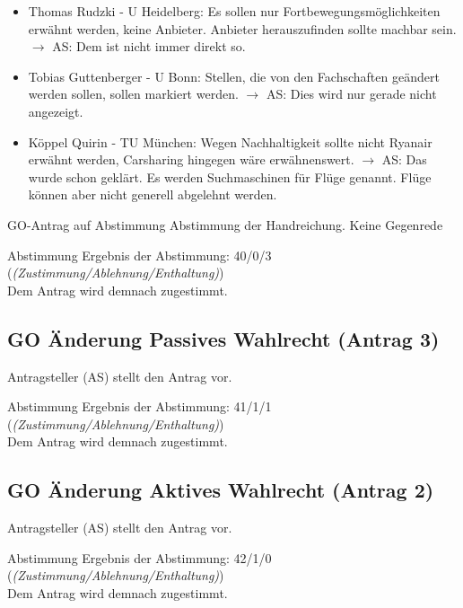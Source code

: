     \begin{itemize}
      \item Thomas Rudzki - U Heidelberg: Es sollen nur Fortbewegungsmöglichkeiten erwähnt werden, keine Anbieter. Anbieter herauszufinden sollte machbar sein. $\rightarrow$ AS: Dem ist nicht immer direkt so.
      \item Tobias Guttenberger - U Bonn: Stellen, die von den Fachschaften geändert werden sollen, sollen markiert werden.
        $\rightarrow$ AS: Dies wird nur gerade nicht angezeigt.
      \item Köppel Quirin - TU München: Wegen Nachhaltigkeit sollte nicht Ryanair erwähnt werden, Carsharing hingegen wäre erwähnenswert.
        $\rightarrow$ AS: Das wurde schon geklärt. Es werden Suchmaschinen für Flüge genannt. Flüge können aber nicht generell abgelehnt werden.
    \end{itemize}

    \begin{danger}{GO-Antrag auf Abstimmung}
      Abstimmung der Handreichung. Keine Gegenrede
    \end{danger}

    \begin{success}{Abstimmung}
      Ergebnis der Abstimmung: 40/0/3 (\textit{(Zustimmung/Ablehnung/Enthaltung)}) \\
      Dem Antrag wird demnach zugestimmt.
    \end{success}

  \subsection{GO Änderung Passives Wahlrecht (Antrag 3)}
    Antragsteller (AS) stellt den Antrag vor.

    \begin{success}{Abstimmung}
      Ergebnis der Abstimmung: 41/1/1 (\textit{(Zustimmung/Ablehnung/Enthaltung)}) \\
      Dem Antrag wird demnach zugestimmt.
    \end{success}

  \subsection{GO Änderung Aktives Wahlrecht (Antrag 2)}
    Antragsteller (AS) stellt den Antrag vor.

    \begin{success}{Abstimmung}
      Ergebnis der Abstimmung: 42/1/0 (\textit{(Zustimmung/Ablehnung/Enthaltung)}) \\
      Dem Antrag wird demnach zugestimmt.
    \end{success}

